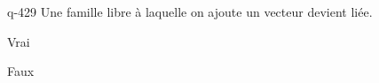 \begin{truefalse}{q-429}
Une famille libre à laquelle on ajoute un vecteur devient liée.
\item Vrai
\item* Faux
\end{truefalse}

